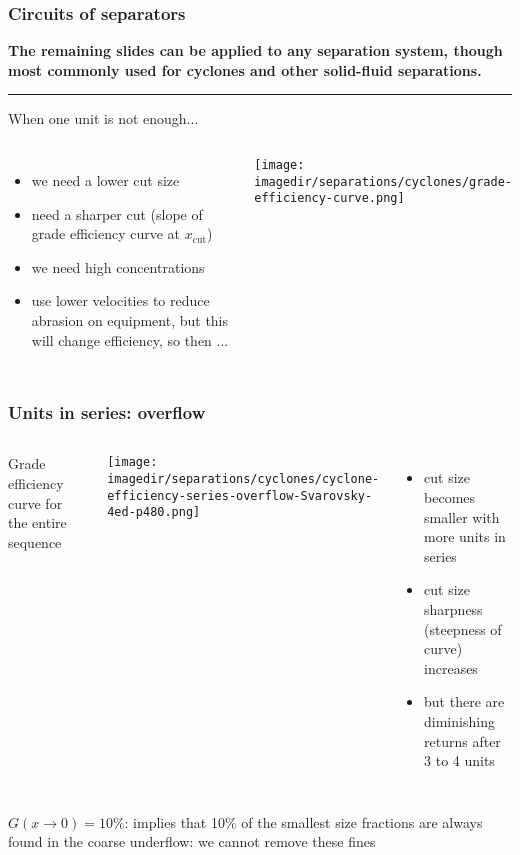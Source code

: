 \begin{frame}\frametitle{Circuits of separators}
	{\scriptsize \textbf{The remaining slides can be applied to any separation system, though most commonly used for cyclones and other solid-fluid separations.}}
	\vspace{12pt}
	\hrule
	\vspace{6pt}
	When one unit is not enough...
	\begin{columns}[t]
			\begin{itemize}
				\item	we need a lower cut size
				\item	need a sharper cut (slope of grade efficiency curve at $x_\text{cut}$)
				\item	we need high concentrations
				\item	use lower velocities to reduce abrasion on equipment, but this will change efficiency, so then ...
			\end{itemize}
			\begin{center}
				\texttt{[image: \\imagedir/separations/cyclones/grade-efficiency-curve.png]}
			\end{center}
	\end{columns}
	\vspace{24pt}
\end{frame}

\begin{frame}\frametitle{Units in series: overflow}
	\begin{columns}[t]
		Grade efficiency curve for the entire sequence
			\begin{center}
				\texttt{[image: \\imagedir/separations/cyclones/cyclone-efficiency-series-overflow-Svarovsky-4ed-p480.png]}
			\end{center}
		\begin{itemize}
			\item	cut size becomes smaller with more units in series
			\item	cut size sharpness (steepness of curve) increases
			\item	but there are diminishing returns after 3 to 4 units
		\end{itemize}
	\end{columns}
	\vspace{12pt}
	$G(x\rightarrow 0)=10\%$: implies that 10\% of the smallest size fractions are always found in the coarse underflow: we cannot remove these fines
\end{frame}

